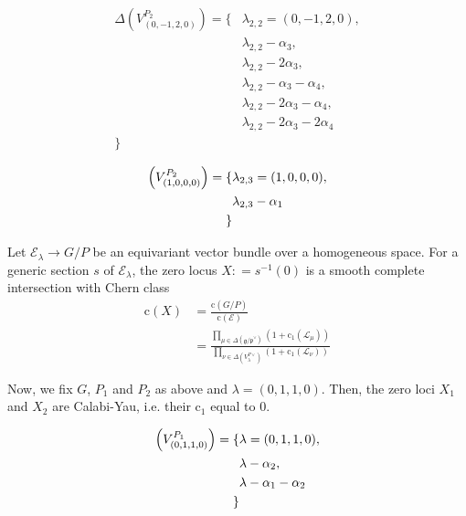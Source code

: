 \documentclass[uplatex,dvipdfmx]{jsarticle}
\newcommand{\defeq}{\mathrel{\mathop:}=}
\begin{document}
\begin{equation}
    \begin{alignedat}{2}
        \Delta\left( V^{P_2}_{(0, -1, 2, 0)} \right)
        =
        \{
            &\lambda_{2,2} = (0, -1, 2, 0),\\
            &\lambda_{2,2} - \alpha_3,\\
            &\lambda_{2,2} - 2\alpha_3,\\
            &\lambda_{2,2} - \alpha_3 -\alpha_4,\\
            &\lambda_{2,2} - 2\alpha_3 - \alpha_4,\\
            &\lambda_{2,2} - 2\alpha_3 - 2\alpha_4\\
        \}
    \end{alignedat}
\end{equation}

\begin{equation}
    \begin{alignedat}
        \Delta\left( V^{P_2}_{(1, 0, 0, 0)} \right)
        =
        \{
            &\lambda_{2,3} = (1, 0, 0, 0),\\
            &\lambda_{2,3} - \alpha_1\\
        \}
    \end{alignedat}
\end{equation}


Let
$\mathcal{E}_\lambda \to G/P$
be an equivariant vector bundle over a homogeneous space.
For a generic section
$s$
of
$\mathcal{E}_\lambda$,
the zero locus
$X \defeq s^{-1}(0)$
is a smooth complete intersection with Chern class
\begin{align}
    \mathrm{c}(X)
    &=
    \frac
    {\mathrm{c}(G/P)}
    {\mathrm{c}(\mathcal{E})}\\
    &=
    \frac
    {\prod_{\mu \in \Delta(\mathfrak{g}/\mathfrak{p}^\vee)}(1+\mathrm{c}_1(\mathcal{L}_\mu))}
    {\prod_{\nu \in \Delta(V^{P\vee}_\lambda)}(1+\mathrm{c}_1(\mathcal{L}_\nu))}
\end{align}

Now, we fix
$G$,
$P_1$
and
$P_2$
as above and
$\lambda = (0, 1, 1, 0)$.
Then, the zero loci
$X_1$
and
$X_2$
are Calabi-Yau,
i.e. their
$\mathrm{c}_1$
equal to
$0$.

\begin{equation}
    \begin{alignedat}
        \Delta\left( V^{P_1}_{(0, 1, 1, 0)} \right)
        =
        \{
            &\lambda = (0, 1, 1, 0),\\
            &\lambda - \alpha_2,\\
            &\lambda - \alpha_1 - \alpha_2\\
        \}
    \end{alignedat}
\end{equation}
\end{document}

